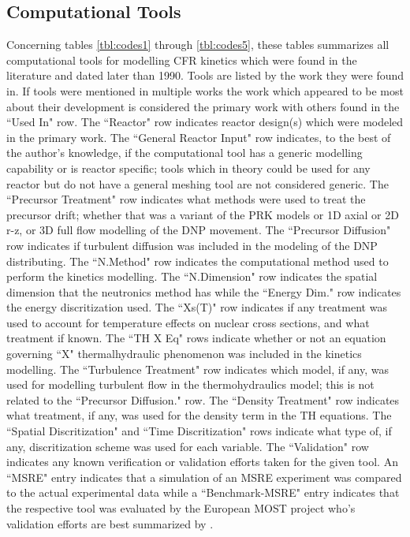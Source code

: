 \documentclass[review]{elsarticle}
\begin{document}


\begin{appendices}

\section{Computational Tools} \label{app:tools}
Concerning tables \ref{tbl:codes1} through \ref{tbl:codes5}, these tables
 summarizes all computational
tools for modelling CFR kinetics which were
found in the literature and dated later than 1990. Tools are listed by the
work they were found in. If tools were mentioned in multiple works the
work which appeared to be most about their development is considered
the primary work with others found in the ``Used In" row. The
``Reactor" row indicates reactor design(s) which were modeled in
the primary work. The ``General Reactor Input" row indicates, to the best
of the author's knowledge, if the computational tool has a generic modelling
capability or is reactor specific; tools which in theory could be used for
any reactor but do not have a general meshing tool are not considered generic.
The ``Precursor Treatment" row indicates what methods were used to
treat the precursor drift; whether that was a variant of the PRK models
or 1D axial or 2D r-z, or 3D full flow modelling of the DNP movement.
The ``Precursor Diffusion" row indicates if turbulent diffusion was included in
the modeling of the DNP distributing.
The ``N.Method" row indicates the computational method used to perform the
kinetics modelling. The ``N.Dimension" row indicates the spatial dimension that
the neutronics method has while the ``Energy Dim." row indicates the energy
discritization used.
The ``Xs(T)" row indicates if any treatment was used to account for temperature
effects on nuclear cross sections, and what treatment if known. 
The ``TH X Eq" rows indicate whether or not an equation governing ``X" thermalhydraulic
phenomenon was
included in the kinetics modelling.
The ``Turbulence Treatment" row 
indicates which model, if any, was used for modelling turbulent flow in the
thermohydraulics model; this is not related to the ``Precursor Diffusion." row.
The ``Density Treatment" row indicates what treatment, if any, was used for the
density term in the TH equations. The ``Spatial Discritization" and ``Time
Discritization" rows indicate what type of, if any, discritization scheme was
used for each variable. The ``Validation" row indicates any known verification
or validation efforts taken for the given tool. An ``MSRE" entry indicates
that a simulation of an MSRE experiment was compared to the actual experimental
data while a ``Benchmark-MSRE" entry indicates that the respective tool was
evaluated by the European MOST project who's validation efforts are best
summarized by \cite{delpech_benchmark_2003}.


\end{appendices}
\end{document}
